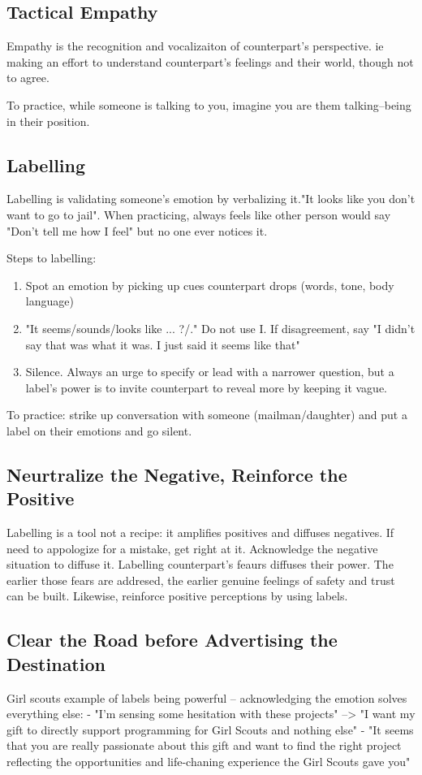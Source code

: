\documentclass{summary}
\begin{document}
\subsection{Tactical Empathy}
Empathy is the recognition and vocalizaiton of counterpart's perspective. ie making an effort to understand counterpart's feelings and their world, though not to agree.

To practice, while someone is talking to you, imagine you are them talking--being in their position.

\subsection{Labelling}
Labelling is validating someone's emotion by verbalizing it."It looks like you don't want to go to jail". When practicing, always feels like other person would say "Don't tell me how I feel" but no one ever notices it.

Steps to labelling:
\begin{enumerate}
  \item Spot an emotion by picking up cues counterpart drops (words, tone, body language)
  \item "It seems/sounds/looks like ... ?/." Do not use I. If disagreement, say "I didn't say that was what it was. I just said it seems like that"
  \item Silence. Always an urge to specify or lead with a narrower question, but a label's power is to invite counterpart to reveal more by keeping it vague.
\end{enumerate}

To practice: strike up conversation with someone (mailman/daughter) and put a label on their emotions and go silent.

\subsection{Neurtralize the Negative, Reinforce the Positive}
Labelling is a tool not a recipe: it amplifies positives and diffuses negatives. If need to appologize for a mistake, get right at it. Acknowledge the negative situation to diffuse it. Labelling counterpart's feaurs diffuses their power. The earlier those fears are addresed, the earlier genuine feelings of safety and trust can be built.
Likewise, reinforce positive perceptions by using labels.

\subsection{Clear the Road before Advertising the Destination}
Girl scouts example of labels being powerful -- acknowledging the emotion solves everything else:
- "I'm sensing some hesitation with these projects" --> "I want my gift to directly support programming for Girl Scouts and nothing else"
- "It seems that you are really passionate about this gift and want to find the right project reflecting the opportunities and life-chaning experience the Girl Scouts gave you"
\end{document}
